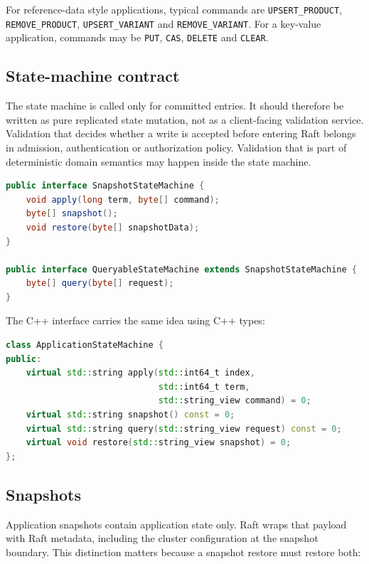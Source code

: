 For reference-data style applications, typical commands are
\texttt{UPSERT\_PRODUCT}, \texttt{REMOVE\_PRODUCT},
\texttt{UPSERT\_VARIANT} and \texttt{REMOVE\_VARIANT}. For a key-value
application, commands may be \texttt{PUT}, \texttt{CAS}, \texttt{DELETE} and
\texttt{CLEAR}.

\subsection{State-machine contract}

The state machine is called only for committed entries. It should therefore be
written as pure replicated state mutation, not as a client-facing validation
service. Validation that decides whether a write is accepted before entering
Raft belongs in admission, authentication or authorization policy. Validation
that is part of deterministic domain semantics may happen inside the state
machine.

\begin{lstlisting}[language=Java,caption={Java state-machine shape}]
public interface SnapshotStateMachine {
    void apply(long term, byte[] command);
    byte[] snapshot();
    void restore(byte[] snapshotData);
}

public interface QueryableStateMachine extends SnapshotStateMachine {
    byte[] query(byte[] request);
}
\end{lstlisting}

The C++ interface carries the same idea using C++ types:

\begin{lstlisting}[language=C++,caption={C++ state-machine shape}]
class ApplicationStateMachine {
public:
    virtual std::string apply(std::int64_t index,
                              std::int64_t term,
                              std::string_view command) = 0;
    virtual std::string snapshot() const = 0;
    virtual std::string query(std::string_view request) const = 0;
    virtual void restore(std::string_view snapshot) = 0;
};
\end{lstlisting}

\subsection{Snapshots}

Application snapshots contain application state only. Raft wraps that payload
with Raft metadata, including the cluster configuration at the snapshot boundary.
This distinction matters because a snapshot restore must restore both:


